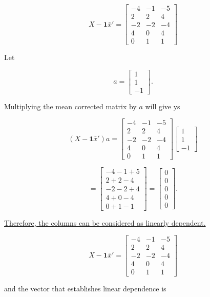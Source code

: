 \documentclass{article}
\begin{document}
$$
\boxed{
X-\mathbf{1}\bar{x}'
=
\begin{bmatrix}
-4&-1&-5\\
2&2&4\\
-2&-2&-4\\
4&0&4\\
0&1&1
\end{bmatrix}}
$$

Let

$$
a=
\begin{bmatrix}
1\\
1\\
-1
\end{bmatrix}.
$$

Multiplying the mean corrected matrix by $a$ will give ys

$$
(X-\mathbf{1}\bar{x}')a
=
\begin{bmatrix}
-4&-1&-5\\
2&2&4\\
-2&-2&-4\\
4&0&4\\
0&1&1
\end{bmatrix}
\begin{bmatrix}
1\\
1\\
-1
\end{bmatrix}
$$

$$
=
\begin{bmatrix}
-4-1+5\\
2+2-4\\
-2-2+4\\
4+0-4\\
0+1-1
\end{bmatrix}
=
\begin{bmatrix}
0\\
0\\
0\\
0\\
0
\end{bmatrix}.
$$

\underline{Therefore, the columns can be considered as linearly dependent.}

\noindent

$$
\boxed{
X-\mathbf{1}\bar{x}'
=
\begin{bmatrix}
-4&-1&-5\\
2&2&4\\
-2&-2&-4\\
4&0&4\\
0&1&1
\end{bmatrix}}
$$

and the vector that establishes linear dependence is
\end{document}
